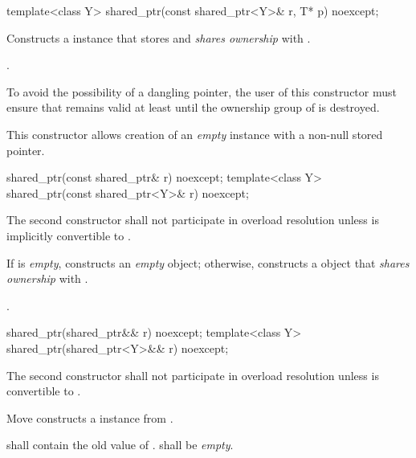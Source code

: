%
\begin{itemdecl}
template<class Y> shared_ptr(const shared_ptr<Y>& r, T* p) noexcept;
\end{itemdecl}

\begin{itemdescr}
\pnum
\effects Constructs a  instance that
stores  and \textit{shares ownership} with .

\pnum
\postconditions {}.

\pnum
\begin{note} To avoid the possibility of a dangling pointer, the
user of this constructor must ensure that  remains valid at
least until the ownership group of  is destroyed. \end{note}

\pnum
\begin{note} This constructor allows creation of an \textit{empty}
 instance with a non-null stored pointer. \end{note}
\end{itemdescr}

%
\begin{itemdecl}
shared_ptr(const shared_ptr& r) noexcept;
template<class Y> shared_ptr(const shared_ptr<Y>& r) noexcept;
\end{itemdecl}

\begin{itemdescr}
\pnum\remark
The second constructor shall not participate in overload resolution unless
 is implicitly convertible to .

\pnum\effects  If  is \textit{empty}, constructs
an \textit{empty}  object; otherwise, constructs
a  object that \textit{shares ownership} with .

\pnum\postconditions  {}.
\end{itemdescr}

%
\begin{itemdecl}
shared_ptr(shared_ptr&& r) noexcept;
template<class Y> shared_ptr(shared_ptr<Y>&& r) noexcept;
\end{itemdecl}

\begin{itemdescr}
\pnum
\remark The second constructor shall not participate in overload resolution unless
 is convertible to .

\pnum
\effects Move constructs a  instance from .

\pnum
\postconditions {} shall contain the old value of
.  shall be \textit{empty}. 
\end{itemdescr}

